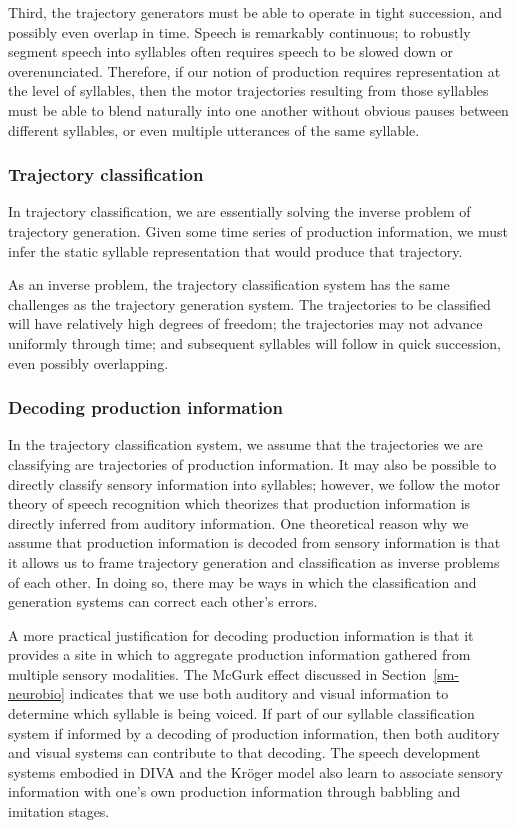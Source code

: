 Third, the trajectory generators
must be able to operate
in tight succession,
and possibly even overlap in time.
Speech is remarkably continuous;
to robustly segment speech into
syllables often requires
speech to be slowed down
or overenunciated.
Therefore, if our notion of production
requires representation at the level of syllables,
then the motor trajectories
resulting from those syllables
must be able to blend naturally into one another
without obvious pauses between
different syllables,
or even multiple utterances of the same syllable.

\subsubsection{Trajectory classification}

In trajectory classification,
we are essentially solving the inverse problem
of trajectory generation.
Given some time series of production information,
we must infer the static syllable representation
that would produce that trajectory.

As an inverse problem,
the trajectory classification system
has the same challenges
as the trajectory generation system.
The trajectories to be classified
will have relatively high degrees of freedom;
the trajectories may not advance uniformly
through time;
and subsequent syllables will follow
in quick succession,
even possibly overlapping.

\subsubsection{Decoding production information}

In the trajectory classification system,
we assume that the trajectories we are classifying
are trajectories of production information.
It may also be possible to directly classify
sensory information into syllables;
however, we follow the motor theory of speech recognition
which theorizes that production information
is directly inferred from auditory information.
One theoretical reason
why we assume that production information
is decoded from sensory information
is that it allows us
to frame trajectory generation and
classification as inverse problems
of each other.
In doing so, there may be ways
in which the classification and generation systems
can correct each other's errors.

A more practical justification
for decoding production information
is that it provides a site in which to
aggregate production information
gathered from multiple sensory modalities.
The McGurk effect discussed
in Section~\ref{sm-neurobio}
indicates that we use both auditory
and visual information to
determine which syllable is being voiced.
If part of our syllable classification system
if informed by a decoding of production information,
then both auditory and visual systems
can contribute to that decoding.
The speech development systems
embodied in DIVA and the Kr\"{o}ger model
also learn to associate sensory information
with one's own production information
through babbling and imitation stages.

